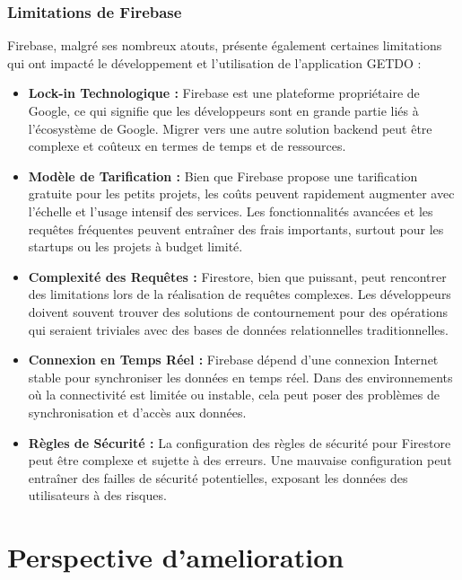 \documentclass[a4paper,12pt]{report}
\begin{document}
     \subsubsection{Limitations de Firebase}
     Firebase, malgré ses nombreux atouts, présente également certaines limitations qui ont impacté le développement et l'utilisation de l'application GETDO :
     \begin{itemize}
     \item\textbf{Lock-in Technologique :} Firebase est une plateforme propriétaire de Google, ce qui signifie que les développeurs sont en grande partie liés à l'écosystème de Google. Migrer vers une autre solution backend peut être complexe et coûteux en termes de temps et de ressources.

     \item\textbf{Modèle de Tarification :} Bien que Firebase propose une tarification gratuite pour les petits projets, les coûts peuvent rapidement augmenter avec l'échelle et l'usage intensif des services. Les fonctionnalités avancées et les requêtes fréquentes peuvent entraîner des frais importants, surtout pour les startups ou les projets à budget limité.

     \item\textbf{Complexité des Requêtes :} Firestore, bien que puissant, peut rencontrer des limitations lors de la réalisation de requêtes complexes. Les développeurs doivent souvent trouver des solutions de contournement pour des opérations qui seraient triviales avec des bases de données relationnelles traditionnelles.

     \item\textbf{Connexion en Temps Réel :} Firebase dépend d'une connexion Internet stable pour synchroniser les données en temps réel. Dans des environnements où la connectivité est limitée ou instable, cela peut poser des problèmes de synchronisation et d'accès aux données.

     \item\textbf{Règles de Sécurité :} La configuration des règles de sécurité pour Firestore peut être complexe et sujette à des erreurs. Une mauvaise configuration peut entraîner des failles de sécurité potentielles, exposant les données des utilisateurs à des risques.
     \end{itemize}
    
  \section{Perspective d'amelioration}
\end{document}

